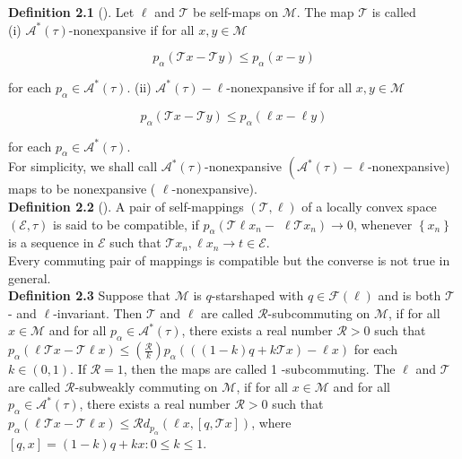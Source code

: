\documentclass[12pt,a4paper,two side]{article}
\begin{document}
\textbf{Definition 2.1} (\cite{citation-key9}). Let $\ell$ and $\mathcal{T}$ be self-maps on $\mathcal{M}$. The map $\mathcal{T}$ is called\\
(i) $\mathcal{A}^*(\tau)$-nonexpansive if for all $x, y \in \mathcal{M}$

$$
p_\alpha(\mathcal{T} x-\mathcal{T} y) \leq p_\alpha(x-y)
$$

for each $p_\alpha \in \mathcal{A}^*(\tau)$.
(ii) $\mathcal{A}^*(\tau)-\ell$-nonexpansive if for all $x, y \in \mathcal{M}$

$$
p_\alpha(\mathcal{T} x-\mathcal{T} y) \leq p_\alpha(\ell x-\ell y)
$$

for each $p_\alpha \in \mathcal{A}^*(\tau)$.\\

For simplicity, we shall call $\mathscr{A}^*(\tau)$-nonexpansive $\left(\mathcal{A}^*(\tau)-\ell\right.$-nonexpansive) maps to be nonexpansive ( $\ell$-nonexpansive).\\

\textbf{Definition 2.2} (\cite{citation-key11}). A pair of self-mappings $(\mathcal{T}, \ell)$ of a locally convex space $(\mathcal{E}, \tau)$ is said to be compatible, if $p_\alpha\left(\mathcal{T} \ell x_n-\right.$ $\left.\ell \mathcal{T} x_n\right) \rightarrow 0$, whenever $\left\{x_n\right\}$ is a sequence in $\mathcal{E}$ such that $\mathcal{T} x_n, \ell x_n \rightarrow t \in \mathcal{E}$.\\
Every commuting pair of mappings is compatible but the converse is not true in general.\\

\textbf{Definition 2.3} Suppose that $\mathcal{M}$ is $q$-starshaped with $q \in \mathcal{F}(\ell)$ and is both $\mathcal{T}$ - and $\ell$-invariant. Then $\mathcal{T}$ and $\ell$ are called $\mathcal{R}$-subcommuting \cite{citation-key12, citation-key13,citation-key14} on $\mathcal{M}$, if for all $x \in \mathcal{M}$ and for all $p_\alpha \in \mathcal{A}^*(\tau)$, there exists a real number $\mathcal{R}>0$ such that $p_\alpha(\ell \mathcal{T} x-\mathcal{T} \ell x) \leq\left(\frac{\mathcal{R}}{k}\right) p_\alpha(((1-k) q+k \mathcal{T} x)-\ell x)$ for each $k \in(0,1)$. If $\mathcal{R}=1$, then the maps are called 1 -subcommuting. The $\ell$ and $\mathcal{T}$ are called $\mathscr{R}$-subweakly commuting \cite{citation-key15} on $\mathcal{M}$, if for all $x \in \mathcal{M}$ and for all $p_\alpha \in \mathcal{A}^*(\tau)$, there exists a real number $\mathcal{R}>0$ such that $p_\alpha(\ell \mathcal{T} x-\mathcal{T} \ell x) \leq \mathcal{R} d_{p_\alpha}(\ell x,[q, \mathcal{T} x])$, where $[q, x]=(1-k) q+k x: 0 \leq k \leq 1$.\\
\end{document}
